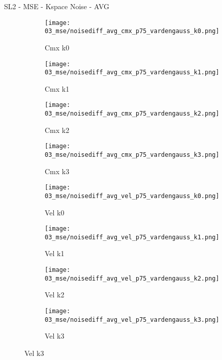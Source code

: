 \documentclass{beamer}
\begin{document}
\begin{frame}{SL2 - MSE - Kspace Noise - AVG}{}
\begin{figure}
\begin{subfigure}{0.24\textwidth}
\texttt{[image: 03\_mse/noisediff\_avg\_cmx\_p75\_vardengauss\_k0.png]}
\vspace{-20pt}
\caption*{\tiny Cmx k0}
\end{subfigure}
\begin{subfigure}{0.24\textwidth}
\texttt{[image: 03\_mse/noisediff\_avg\_cmx\_p75\_vardengauss\_k1.png]}
\vspace{-20pt}
\caption*{\tiny Cmx k1}
\end{subfigure}
\begin{subfigure}{0.24\textwidth}
\texttt{[image: 03\_mse/noisediff\_avg\_cmx\_p75\_vardengauss\_k2.png]}
\vspace{-20pt}
\caption*{\tiny Cmx k2}
\end{subfigure}
\begin{subfigure}{0.24\textwidth}
\texttt{[image: 03\_mse/noisediff\_avg\_cmx\_p75\_vardengauss\_k3.png]}
\vspace{-20pt}
\caption*{\tiny Cmx k3}
\end{subfigure}

\begin{subfigure}{0.24\textwidth}
\texttt{[image: 03\_mse/noisediff\_avg\_vel\_p75\_vardengauss\_k0.png]}
\vspace{-20pt}
\caption*{\tiny Vel k0}
\end{subfigure}
\begin{subfigure}{0.24\textwidth}
\texttt{[image: 03\_mse/noisediff\_avg\_vel\_p75\_vardengauss\_k1.png]}
\vspace{-20pt}
\caption*{\tiny Vel k1}
\end{subfigure}
\begin{subfigure}{0.24\textwidth}
\texttt{[image: 03\_mse/noisediff\_avg\_vel\_p75\_vardengauss\_k2.png]}
\vspace{-20pt}
\caption*{\tiny Vel k2}
\end{subfigure}
\begin{subfigure}{0.24\textwidth}
\texttt{[image: 03\_mse/noisediff\_avg\_vel\_p75\_vardengauss\_k3.png]}
\vspace{-20pt}
\caption*{\tiny Vel k3}
\end{subfigure}
\end{figure}
\end{frame}
\end{document}
